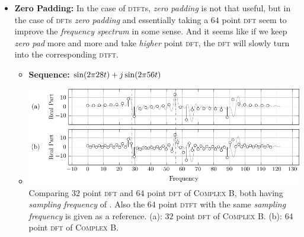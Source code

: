 \documentclass[../../course]{subfiles}
\begin{document}
\begin{itemize} [label=]

    \item \textbf{Zero Padding:} In the case of \textsc{dtft}s, \emph{zero padding} is not that
        useful, but in the case of \textsc{dft}s \emph{zero padding} and essentially taking a
        $64$ point \textsc{dft} seem to improve the \emph{frequency spectrum} in some sense.
        And it seems like if we keep \emph{zero pad} more and more and take \emph{higher} point \textsc{dft},
        the \textsc{dft} will slowly turn into the corresponding \textsc{dtft}.

        \begin{itemize} [label=]

            \item \textbf{Sequence:} $\sin(2 \pi 28 t) + j \sin(2 \pi 56 t)$

            \item \begin{minipage}[b] {0.85\textwidth}
                    \vspace{6pt}
                    \centering
                     {
                        \includegraphics[height = 0.8\textheight] {tikzpics/plotCompDft32Dft64.pdf}
                    }
                     {
                        Comparing $32$ point \textsc{dft} and $64$ point \textsc{dft} of \textsc{Complex B},
                        both having \emph{sampling frequency} of \sampFreqNormJust. Also the $64$ point
                        \textsc{dtft} with the same \emph{sampling frequency} is given as a reference.
                        (a): $32$ point \textsc{dft} of \textsc{Complex B}.
                        (b): $64$ point \textsc{dft} of \textsc{Complex B}.
                    }
                    \label{fig:compDft32Dft64}
            \end{minipage}


\end{itemize}
\end{itemize}
\end{document}
